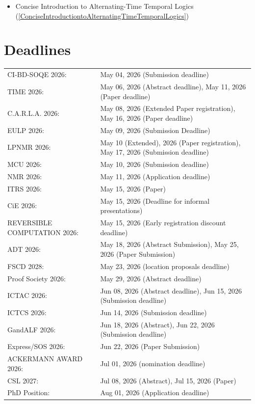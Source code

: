 \documentclass[prodmode,acmtecs]{acmsmall} %
\begin{document}
\begin{itemize}
\begin{itemize}\item Concise Introduction to Alternating-Time Temporal Logics (\cref{ConciseIntroductiontoAlternatingTimeTemporalLogics})
\end{itemize} 
\end{itemize}\section{Deadlines}\label{deadlines}\begin{tabulary}{\linewidth}{LL}CI-BD-SOQE 2026:  & May 04, 2026 (Submission deadline) \\
TIME 2026:  & May 06, 2026 (Abstract deadline), May 11, 2026 (Paper deadline) \\
C.A.R.L.A. 2026:  & May 08, 2026 (Extended Paper registration), May 16, 2026 (Paper deadline) \\
EULP 2026:  & May 09, 2026 (Submission Deadline) \\
LPNMR 2026:  & May 10 (Extended), 2026 (Paper registration), May 17, 2026 (Submission deadline) \\
MCU 2026:  & May 10, 2026 (Submission deadline) \\
NMR 2026:  & May 11, 2026 (Application deadline) \\
ITRS 2026:  & May 15, 2026 (Paper) \\
CiE 2026:  & May 15, 2026 (Deadline for informal presentations) \\
REVERSIBLE COMPUTATION 2026:  & May 15, 2026 (Early registration discount deadline) \\
ADT 2026:  & May 18, 2026 (Abstract Submission), May 25, 2026 (Paper Submission) \\
FSCD 2028:  & May 23, 2026 (location proposals deadline) \\
Proof Society 2026:  & May 29, 2026 (Abstract deadline) \\
ICTAC 2026:  & Jun 08, 2026 (Abstract deadline), Jun 15, 2026 (Submission deadline) \\
ICTCS 2026:  & Jun 14, 2026 (Submission deadline) \\
GandALF 2026:  & Jun 18, 2026 (Abstract), Jun 22, 2026 (Submission deadline) \\
Express/SOS 2026:  & Jun 22, 2026 (Paper Submission) \\
ACKERMANN AWARD 2026:  & Jul 01, 2026 (nomination deadline) \\
CSL 2027:  & Jul 08, 2026 (Abstract), Jul 15, 2026 (Paper) \\
PhD Position:  & Aug 01, 2026 (Application deadline) \\
\end{tabulary}
\end{document}
